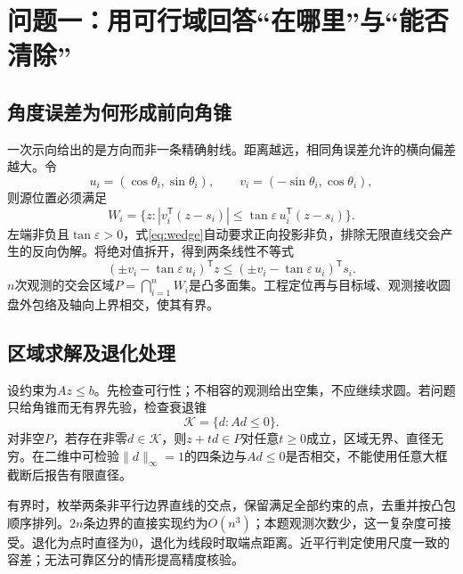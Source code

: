\documentclass[UTF8,a4paper,zihao=-4,fontset=mac]{ctexart}
\begin{document}
\section{问题一：用可行域回答“在哪里”与“能否清除”}
\subsection{角度误差为何形成前向角锥}
一次示向给出的是方向而非一条精确射线。距离越远，相同角误差允许的横向偏差越大。令
\begin{equation}
u_i=(\cos\theta_i,\sin\theta_i),\qquad v_i=(-\sin\theta_i,\cos\theta_i),
\end{equation}
则源位置必须满足
\begin{equation}\label{eq:wedge}
W_i=\{z:|v_i^\mathsf T(z-s_i)|\le\tan\varepsilon\,u_i^\mathsf T(z-s_i)\}.
\end{equation}
左端非负且$\tan\varepsilon>0$，式\eqref{eq:wedge}自动要求正向投影非负，排除无限直线交会产生的反向伪解。将绝对值拆开，得到两条线性不等式
\begin{equation}
(\pm v_i-\tan\varepsilon\,u_i)^\mathsf Tz
\le(\pm v_i-\tan\varepsilon\,u_i)^\mathsf Ts_i.
\end{equation}
$n$次观测的交会区域$P=\bigcap_{i=1}^nW_i$是凸多面集。工程定位再与目标域、观测接收圆盘外包络及轴向上界相交，使其有界。

\subsection{区域求解及退化处理}
设约束为$Az\le b$。先检查可行性；不相容的观测给出空集，不应继续求圆。若问题只给角锥而无有界先验，检查衰退锥
\begin{equation}
\mathcal K=\{d:Ad\le0\}.
\end{equation}
对非空$P$，若存在非零$d\in\mathcal K$，则$z+td\in P$对任意$t\ge0$成立，区域无界、直径无穷。在二维中可检验$\|d\|_\infty=1$的四条边与$Ad\le0$是否相交，不能使用任意大框截断后报告有限直径。

有界时，枚举两条非平行边界直线的交点，保留满足全部约束的点，去重并按凸包顺序排列。$2n$条边界的直接实现约为$O(n^3)$；本题观测次数少，这一复杂度可接受。退化为点时直径为0，退化为线段时取端点距离。近平行判定使用尺度一致的容差；无法可靠区分的情形提高精度核验。
\end{document}
